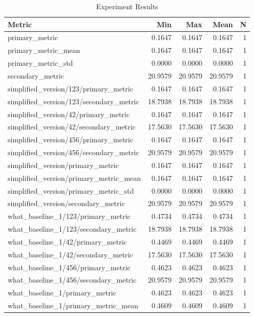 \begin{table}[h]
\centering
\caption{Experiment Results}
\begin{tabular}{lrrrr}
\hline
Metric & Min & Max & Mean & N \\
\hline
primary_metric & 0.1647 & 0.1647 & 0.1647 & 1 \\
primary_metric_mean & 0.1647 & 0.1647 & 0.1647 & 1 \\
primary_metric_std & 0.0000 & 0.0000 & 0.0000 & 1 \\
secondary_metric & 20.9579 & 20.9579 & 20.9579 & 1 \\
simplified_version/123/primary_metric & 0.1647 & 0.1647 & 0.1647 & 1 \\
simplified_version/123/secondary_metric & 18.7938 & 18.7938 & 18.7938 & 1 \\
simplified_version/42/primary_metric & 0.1647 & 0.1647 & 0.1647 & 1 \\
simplified_version/42/secondary_metric & 17.5630 & 17.5630 & 17.5630 & 1 \\
simplified_version/456/primary_metric & 0.1647 & 0.1647 & 0.1647 & 1 \\
simplified_version/456/secondary_metric & 20.9579 & 20.9579 & 20.9579 & 1 \\
simplified_version/primary_metric & 0.1647 & 0.1647 & 0.1647 & 1 \\
simplified_version/primary_metric_mean & 0.1647 & 0.1647 & 0.1647 & 1 \\
simplified_version/primary_metric_std & 0.0000 & 0.0000 & 0.0000 & 1 \\
simplified_version/secondary_metric & 20.9579 & 20.9579 & 20.9579 & 1 \\
what_baseline_1/123/primary_metric & 0.4734 & 0.4734 & 0.4734 & 1 \\
what_baseline_1/123/secondary_metric & 18.7938 & 18.7938 & 18.7938 & 1 \\
what_baseline_1/42/primary_metric & 0.4469 & 0.4469 & 0.4469 & 1 \\
what_baseline_1/42/secondary_metric & 17.5630 & 17.5630 & 17.5630 & 1 \\
what_baseline_1/456/primary_metric & 0.4623 & 0.4623 & 0.4623 & 1 \\
what_baseline_1/456/secondary_metric & 20.9579 & 20.9579 & 20.9579 & 1 \\
what_baseline_1/primary_metric & 0.4623 & 0.4623 & 0.4623 & 1 \\
what_baseline_1/primary_metric_mean & 0.4609 & 0.4609 & 0.4609 & 1 \\

\end{tabular}
\end{table}
